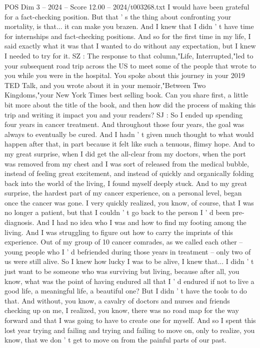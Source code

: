 \begin{textsample}{POS Dim 3 – 2024 – Score 12.00 – 2024/t003268.txt}
I would have been grateful for a fact-checking position.
But that ' s the thing about confronting your mortality, is that... it can make you brazen.
And I knew that I didn ' t have time for internships and fact-checking positions.
And so for the first time in my life, I said exactly what it was that I wanted to do without any expectation, but I knew I needed to try for it.
SZ : The response to that column,"Life, Interrupted,"led to your subsequent road trip across the US to meet some of the people that wrote to you while you were in the hospital.
You spoke about this journey in your 2019 TED Talk, and you wrote about it in your memoir,"Between Two Kingdoms,"your New York Times best selling book.
Can you share first, a little bit more about the title of the book, and then how did the process of making this trip and writing it impact you and your readers?
SJ : So I ended up spending four years in cancer treatment.
And throughout those four years, the goal was always to eventually be cured.
And I hadn ' t given much thought to what would happen after that, in part because it felt like such a tenuous, flimsy hope.
And to my great surprise, when I did get the all-clear from my doctors, when the port was removed from my chest and I was sort of released from the medical bubble, instead of feeling great excitement, and instead of quickly and organically folding back into the world of the living, I found myself deeply stuck.
And to my great surprise, the hardest part of my cancer experience, on a personal level, began once the cancer was gone.
I very quickly realized, you know, of course, that I was no longer a patient, but that I couldn ' t go back to the person I ' d been pre-diagnosis.
And I had no idea who I was and how to find my footing among the living.
And I was struggling to figure out how to carry the imprints of this experience.
Out of my group of 10 cancer comrades, as we called each other -- young people who I ' d befriended during those years in treatment -- only two of us were still alive.
So I knew how lucky I was to be alive, I knew that...
I didn ' t just want to be someone who was surviving but living, because after all, you know, what was the point of having endured all that I ' d endured if not to live a good life, a meaningful life, a beautiful one?
But I didn ' t have the tools to do that.
And without, you know, a cavalry of doctors and nurses and friends checking up on me, I realized, you know, there was no road map for the way forward and that I was going to have to create one for myself.
And so I spent this lost year trying and failing and trying and failing to move on, only to realize, you know, that we don ' t get to move on from the painful parts of our past.

\end{textsample}
